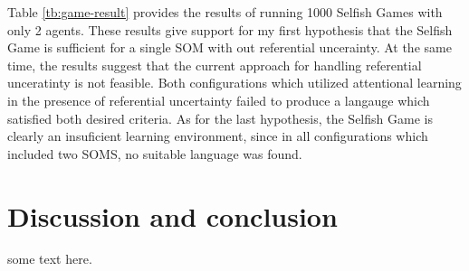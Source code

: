 \documentclass[a4paper,11pt]{article}
\begin{document}
Table \ref{tb:game-result} provides the results of running 1000 Selfish Games
with only 2 agents.  These results give support for my first hypothesis that the
Selfish Game is sufficient for a single SOM with out referential uncerainty.  At
the same time, the results suggest that the current approach for handling
referential unceratinty is not feasible.  Both configurations which utilized
attentional learning in the presence of referential uncertainty failed to
produce a langauge which satisfied both desired criteria.  As for the last
hypothesis, the Selfish Game is clearly an insuficient learning environment,
since in all configurations which included two SOMS, no suitable language was
found.


\section{Discussion and conclusion}
some text here.   
\end{document}
